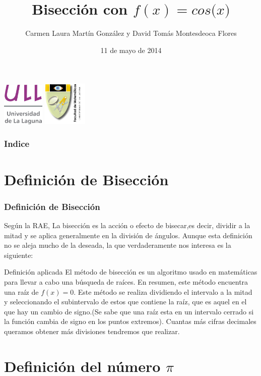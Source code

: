 \documentclass{beamer}
\title[La bisección de $f(x)=cos($\pi$x)$ en \textsc{Beamer}]{Bisección con $f(x)=cos($\pi$x)$}
\author[D. Montesdeoca y  L. Martín]{Carmen Laura Martín González
y
David Tomás Montesdeoca Flores}
\date[11/05/14]{11 de mayo de 2014}
\begin{document}
\begin{frame}
\includegraphics[width=0.15\textwidth]{ULL.jpeg}
\hspace*{7.5cm}
\includegraphics[width=0.16\textwidth]{logocentro.jpeg}
\hspace*{7.5cm}
\titlepage
\end{frame}

\begin{frame}
\frametitle{Indice}
\tableofcontents[pausesections]

\end{frame}

\section{Definición de Bisección}

\begin{frame}
\frametitle{Definición de Bisección}

Según la RAE, La bisección es la acción o efecto de bisecar,es decir, dividir a la mitad y se aplica generalmente en la división de ángulos. Aunque esta definición no se aleja mucho de la deseada, la que verdaderamente nos interesa es la siguiente:

\begin{block}{Definición aplicada}
El método de bisección es un algoritmo usado en matemáticas para llevar a cabo una búsqueda de raíces. En resumen, este método encuentra una raíz de $f(x)=0$. Este método se realiza dividiendo el intervalo a la mitad y seleccionando el subintervalo de estos que contiene la raíz, que es aquel en el que hay un cambio de signo.(Se sabe que una raíz esta en un intervalo cerrado si la función cambia de signo en los puntos extremos). Cuantas más cifras decimales queramos obtener más divisiones tendremos que realizar.
\end{block} 

\end{frame}

\section{Definición del número $\pi$}
\end{document}
